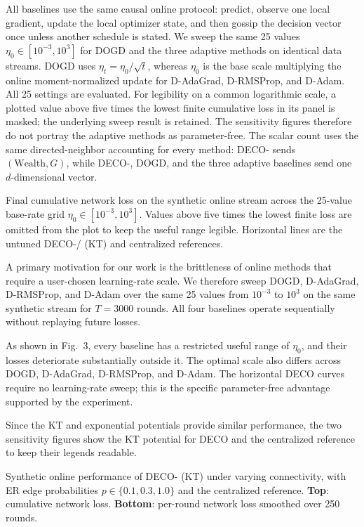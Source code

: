 \documentclass[12pt,english]{reviewresponse}
\newcommand{\algname}{{DECO}\xspace}
\newcommand{\w}{\text{Wealth}}
\begin{document}
\begin{revresponse}
\begin{changes}
        All baselines use the same causal online protocol: predict, observe one local gradient, update the local optimizer state, and then gossip the decision vector once unless another schedule is stated.
        We sweep the same 25 values $\eta_0\in[10^{-3},10^3]$ for DOGD and the three adaptive methods on identical data streams.
        DOGD uses $\eta_t=\eta_0/\sqrt{t}$, whereas $\eta_0$ is the base scale multiplying the online moment-normalized update for D-AdaGrad, D-RMSProp, and D-Adam.
        All 25 settings are evaluated. For legibility on a common logarithmic scale, a plotted value above five times the lowest finite cumulative loss in its panel is masked; the underlying sweep result is retained.
        The sensitivity figures therefore do not portray the adaptive methods as parameter-free.
        The scalar count uses the same directed-neighbor accounting for every method: \algname{}- sends $(\w,G)$, while \algname{}-, DOGD, and the three adaptive baselines send one $d$-dimensional vector.

        Final cumulative network loss on the synthetic online stream across the 25-value base-rate grid $\eta_0\in[10^{-3},10^3]$. Values above five times the lowest finite loss are omitted from the plot to keep the useful range legible. Horizontal lines are the untuned \algname{}-/ (KT) and centralized references.

        A primary motivation for our work is the brittleness of online methods that require a user-chosen learning-rate scale.
        We therefore sweep DOGD, D-AdaGrad, D-RMSProp, and D-Adam over the same 25 values from $10^{-3}$ to $10^3$ on the same synthetic stream for $T=3000$ rounds.
        All four baselines operate sequentially without replaying future losses.

        As shown in Fig.~3, every baseline has a restricted useful range of $\eta_0$, and their losses deteriorate substantially outside it.
        The optimal scale also differs across DOGD, D-AdaGrad, D-RMSProp, and D-Adam.
        The horizontal \algname{} curves require no learning-rate sweep; this is the specific parameter-free advantage supported by the experiment.

        Since the KT and exponential potentials provide similar performance, the two sensitivity figures show the KT potential for \algname{} and the centralized reference to keep their legends readable.

        Synthetic online performance of \algname{}- (KT) under varying connectivity, with ER edge probabilities $p\in\{0.1,0.3,1.0\}$ and the centralized reference. \textbf{Top}: cumulative network loss. \textbf{Bottom}: per-round network loss smoothed over 250 rounds.


\end{changes}
\end{revresponse}
\end{document}
